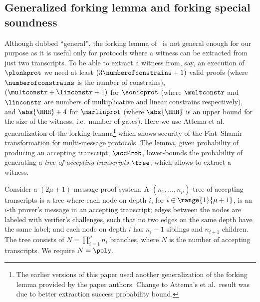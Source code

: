 \subsection{Generalized forking lemma and forking special soundness}
Although dubbed ``general'', the forking lemma of~\cite{CCS:BelNev06} is not general
enough for our purpose as it is useful only for protocols where a witness can be
extracted from just two transcripts. To be able to extract a witness from, say, an
execution of $\plonkprot$ we need at least $(3 \numberofconstrains + 1)$ valid proofs
(where $\numberofconstrains$ is the number of constrains),
$(\multconstr + \linconstr + 1)$ for $\sonicprot$ (where $\multconstr$ and
$\linconstr$ are numbers of multiplicative and linear constrains respectively), and
$\abs{\HHH} + 4$ for $\marlinprot$ (where $\abs{\HHH}$ is an upper bound for the size
of the witness, i.e.~number of gates). Here we use Attema et
al.~\cite{EPRINT:AttFehKlo21short} generalization of the forking lemma\footnote{The
  earlier versions of this paper used another generalization of the forking lemma
  provided by the paper authors. Change to Attema's et al.~result was due to better
  extraction success probability bound.}  which shows security of the Fiat--Shamir
transformation for multi-message protocols. The lemma, given probability of producing
an accepting transcript, $\accProb$, lower-bounds the probability of generating a
\emph{tree of accepting transcripts} $\tree$, which allows to extract a witness.

\begin{definition}
	\label{def:tree_of_accepting_transcripts}
	Consider a $(2\mu + 1)$-message proof system. A $(n_1,
  \ldots, n_\mu)$-tree of accepting transcripts is a tree where each node on
  depth $i$, for $i \in \range{1}{\mu + 1}$, is an $i$-th prover's message in an
  accepting transcript; edges between the nodes are labeled with verifier's
  challenges, such that no two edges on the same depth have the same
  label; and each node on depth $i$ has $n_{i} - 1$ siblings and $n_{i +
    1}$ children. The tree consists of $N = \prod_{i = 1}^\mu n_i$
  branches, where $N$ is the number of accepting transcripts. We require $N = \poly$.
\end{definition}

\iffalse
		
